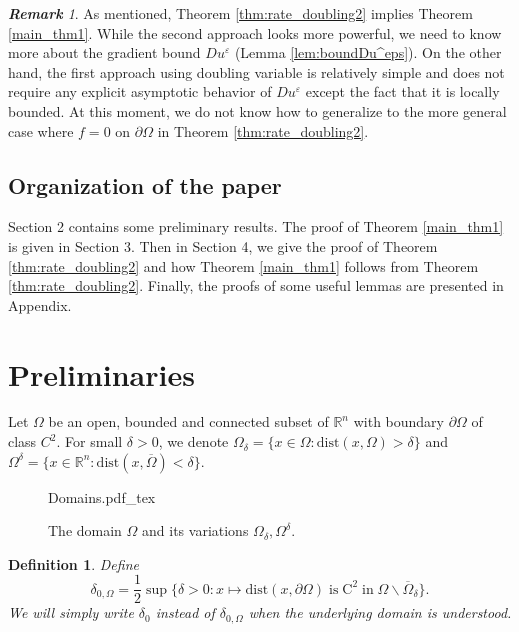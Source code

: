 \documentclass[12pt,reqno]{amsart}
\numberwithin{figure}{section}
\theoremstyle{plain}
\newtheorem{defn}{Definition}
\theoremstyle{remark}
\newtheorem{rem}{\bf{Remark}}
\numberwithin{equation}{section}
\newcommand{\rmC}{\mathrm{C}}
\newcommand{\incfig}[1]{%
    \def\svgwidth{\columnwidth}
    {#1.pdf_tex}
}
\begin{document}
\begin{rem} As mentioned, Theorem \ref{thm:rate_doubling2} implies Theorem \ref{main_thm1}. While the second approach looks more powerful, we need to know more about the gradient bound $Du^\varepsilon$ (Lemma \ref{lem:boundDu^eps}). On the other hand, the first approach using doubling variable is relatively simple and does not require any explicit asymptotic behavior of $Du^\varepsilon$ except the fact that it is locally bounded. At this moment, we do not know how to generalize to the more general case where $f = 0$ on $\partial\Omega$ in Theorem \ref{thm:rate_doubling2}.
\end{rem}



\subsection*{Organization of the paper} Section 2 contains some preliminary results. The proof of Theorem \ref{main_thm1} is given in Section 3. Then in Section 4, we give the proof of Theorem \ref{thm:rate_doubling2} and how Theorem \ref{main_thm1} follows from Theorem \ref{thm:rate_doubling2}. Finally, the proofs of some useful lemmas are presented in Appendix.

\section{Preliminaries}\label{sec:prelim} 
Let $\Omega$ be an open, bounded and connected subset of $\mathbb{R}^n$ with boundary $\partial\Omega$ of class $C^2$. For small $\delta>0$, we denote $\Omega_\delta = \{x\in \Omega: \mathrm{dist}(x,\Omega) > \delta\}$ and $\Omega^\delta = \{x\in \mathbb{R}^n: \mathrm{dist}(x,\overline{\Omega}) < \delta\}$. 
\begin{figure}[ht]
    \centering
    \def\svgwidth{0.35\columnwidth}
    {Domains.pdf_tex}
    \caption{The domain $\Omega$ and its variations $\Omega_\delta, \Omega^\delta$.}
    \label{fig:Domains}
\end{figure}

\begin{defn} Define
\begin{equation}\label{def:delta_0}
    \delta_{0,\Omega} =\frac{1}{2}\sup \big\{ \delta > 0: x\mapsto\mathrm{dist}(x,\partial\Omega)\;\text{is}\;\rmC^2\;\text{in}\;\Omega\backslash\overline{\Omega}_{\delta} \big\}.
\end{equation}
We will simply write $\delta_0$ instead of $\delta_{0,\Omega}$ when the underlying domain is understood.
\end{defn}
\end{document}
